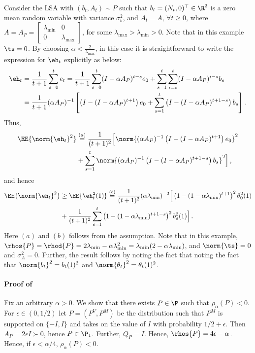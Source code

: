 Consider the LSA with $(b_t,A_t)\sim P$ such that $b_t=(N_t,0)^\top\in\R^2$ is a zero mean \iid random variable with variance $\sigma^2_b$, and $A_t=A,\,\forall t\geq 0$, where $A=A_P=\begin{bmatrix} \lambda_{\min} &0\\ 0& \lambda_{\max}\end{bmatrix}$, for some $\lambda_{\max}>\lambda_{\min}>0$. Note that in this example $\ts=0$.
By choosing $\alpha<\frac2{\lambda_{\max}}$, in this case it is straightforward to write the expression for $\eh_t$ explicitly as below:
\begin{align*}
\eh_t&=\frac{1}{t+1}\sum_{s=0}^t e_t = \frac{1}{t+1}\sum_{s=0}^t (I-\alpha A_P)^{t-s} e_0 + \sum_{s=1}^t \sum_{i=s}^t (I-\alpha A_P)^{i-s} b_s\\
&=\frac{1}{t+1}(\alpha A_P)^{-1}\left[\left(I-(I-\alpha A_P)^{t+1}\right)e_0 + \sum_{s=1}^t \left(I-(I-\alpha A_P)^{t+1-s}\right) b_s\right]\,.
\end{align*}
Thus,
\begin{align*}
\EE{\norm{\eh_t}^2}&\stackrel{(a)}{=}\frac{1}{(t+1)^2}\Big[\norm{(\alpha A_P)^{-1}\left(I-(I-\alpha A_P)^{t+1}\right)e_0}^2 \\ 
&+\sum_{s=1}^t \norm{(\alpha A_P)^{-1}\left(I-(I-\alpha A_P)^{t+1-s}\right)b_s}^2\Big]\,,
\end{align*}
and hence
\begin{align*}
\EE{\norm{\eh_t}^2}
& \geq \EE{\eh^2_t(1)}\stackrel{(b)}{=}\frac{1}{(t+1)^2}(\alpha \lambda_{\min})^{-2}\Big[\left(1-(1-\alpha \lambda_{\min})^{t+1}\right)^2 \theta^2_0(1)\\
& + \frac{1}{(t+1)^2}\sum_{s=1}^t\left(1-(1-\alpha \lambda_{\min})^{t+1-s}\right)^2 b^2_s(1) \Big]\,.
\end{align*}
Here $(a)$ and $(b)$ follows from the \iid assumption. Note that in this example, $\rhos{P}=\rhod{P}=2\lambda_{\min} -\alpha \lambda_{\min}^2=\lambda_{\min}(2-\alpha \lambda_{\min})$, and $\norm{\ts}=0$ and $\sigma^2_A=0$. Further, the result follows by noting the fact that noting the fact that $\norm{b_t}^2=b_t(1)^2$ and $\norm{\theta_t}^2=\theta_t(1)^2$.




\paragraph{Proof of }
Fix an arbitrary $\alpha>0$. We show that there exists $P\in \P$ such that $\rho_\alpha(P)<0$.
For $\epsilon \in (0,1/2)$ let $P=(P^V,P^M)$ be the distribution such that $P^M$ is supported on $\{-I,I\}$ and takes on the value of $I$ with probability $1/2+\epsilon$. Then $A_P = 2\epsilon I \succ 0$, hence $P\in \P_1$. Further, $Q_P = I$.
Hence, $\rhos{P} = 4\epsilon-\alpha$. Hence, if $\epsilon<\alpha/4$, $\rho_\alpha(P)<0$.

